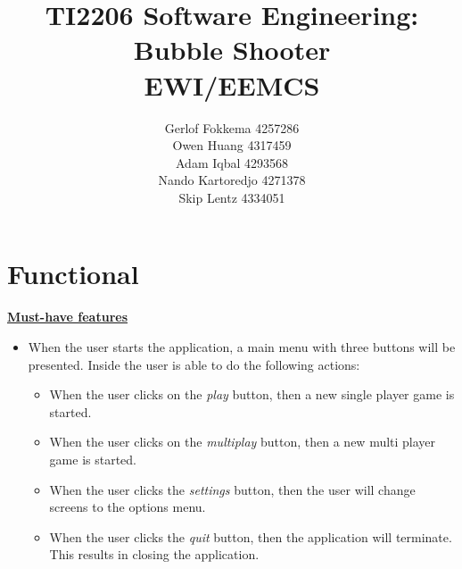 \documentclass[a4paper,11pt]{article}
\title{TI2206 Software Engineering: Bubble Shooter \\ EWI/EEMCS}
\author{Gerlof Fokkema 4257286 \\
	Owen Huang 4317459 \\
	Adam Iqbal 4293568 \\
	Nando Kartoredjo 4271378 \\
	Skip Lentz 4334051 \\
}
\begin{document}
\maketitle

\thispagestyle{empty}
\newpage
\setcounter{page}{1}

\section*{Functional}
\textbf{\underline{Must-have features}}
\begin{itemize}
  \item When the user starts the application,
        a main menu with three buttons will be presented.
        Inside the user is able to do the following actions:
  \begin{itemize}
    \item When the user clicks on the \textit{play} button,
          then a new single player game is started.
    \item When the user clicks on the \textit{multiplay} button,
          then a new multi player game is started.
    \item When the user clicks the \textit{settings} button,
          then the user will change screens to the options menu.
    \item When the user clicks the \textit{quit} button,
          then the application will terminate.
          This results in closing the application.
  \end{itemize}


\end{itemize}
\end{document}
